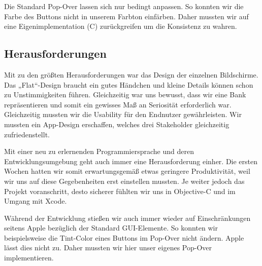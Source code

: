 Die Standard Pop-Over lassen sich nur bedingt anpassen. So konnten wir die Farbe des Buttons nicht in unserem Farbton einfärben. Daher mussten wir auf eine Eigenimplementation (C) zurückgreifen um die Konsistenz zu wahren.


\subsection{Herausforderungen}
	Mit zu den größten Herausforderungen war das Design der einzelnen Bildschirme. Das „Flat“-Design braucht ein gutes Händchen und kleine Details können schon zu Unstimmigkeiten führen. Gleichzeitig war uns bewusst, dass wir eine Bank repräsentieren und somit ein gewisses Maß an Seriosität erforderlich war. Gleichzeitig mussten wir die Usability für den Endnutzer gewährleisten. Wir mussten ein App-Design erschaffen, welches drei Stakeholder gleichzeitig zufriedenstellt.

%

	Mit einer neu zu erlernenden Programmiersprache und deren Entwicklungsumgebung geht auch immer eine Herausforderung einher. Die ersten Wochen hatten wir somit erwartungsgemäß etwas geringere Produktivität, weil wir uns auf diese Gegebenheiten erst einstellen mussten. Je weiter jedoch das Projekt voranschritt, desto sicherer fühlten wir uns in Objective-C und im Umgang mit Xcode.

	Während der Entwicklung stießen wir auch immer wieder auf Einschränkungen seitens Apple bezüglich der Standard GUI-Elemente. So konnten wir beispielsweise die Tint-Color eines Buttons im Pop-Over nicht ändern. Apple lässt dies nicht zu. Daher mussten wir hier unser eigenes Pop-Over implementieren.
	
